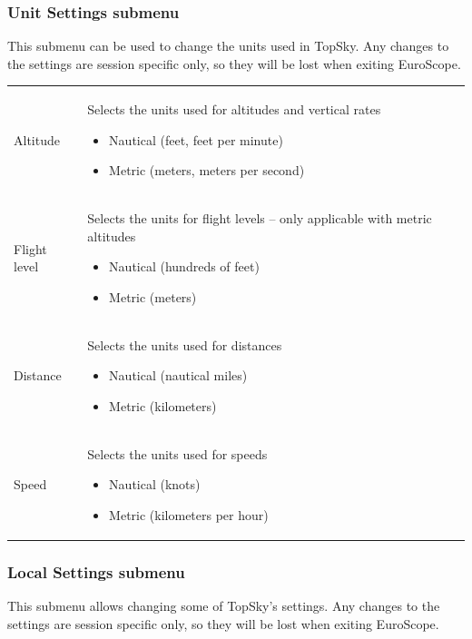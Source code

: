 \documentclass[a4paper,oneside,11pt]{memoir}
\begin{document}
\subsubsection{Unit Settings submenu}
\label{menu:unitset}

This submenu can be used to change the units used in TopSky. Any changes to the settings are session specific only, so they will be lost when exiting EuroScope.

\begin{longtable}{p{5cm} p{7.5cm}}
  Altitude & Selects the units used for altitudes and vertical rates
    \begin{itemize}
      \item Nautical (feet, feet per minute)
      \item Metric (meters, meters per second)
    \end{itemize}\\
  Flight level & Selects the units for flight levels – only applicable with metric altitudes
    \begin{itemize}
      \item Nautical (hundreds of feet)
      \item Metric (meters)
    \end{itemize}\\
  Distance & Selects the units used for distances
    \begin{itemize}
      \item  Nautical (nautical miles)
      \item Metric (kilometers)
    \end{itemize}\\
  Speed & Selects the units used for speeds
    \begin{itemize}
      \item Nautical (knots)
      \item Metric (kilometers per hour)
    \end{itemize}\\
\end{longtable}

\subsubsection*{Local Settings submenu}
\label{menu:localset}

This submenu allows changing some of TopSky’s settings. Any changes to the settings are session specific only, so they will be lost when exiting EuroScope.
\end{document}
